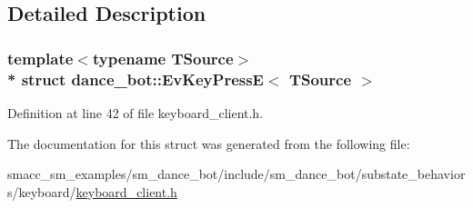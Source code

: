 \subsection{Detailed Description}
\subsubsection*{template$<$typename T\+Source$>$\\*
struct dance\+\_\+bot\+::\+Ev\+Key\+Press\+E$<$ T\+Source $>$}



Definition at line 42 of file keyboard\+\_\+client.\+h.



The documentation for this struct was generated from the following file\+:\begin{DoxyCompactItemize}
\item 
smacc\+\_\+sm\+\_\+examples/sm\+\_\+dance\+\_\+bot/include/sm\+\_\+dance\+\_\+bot/substate\+\_\+behaviors/keyboard/\hyperlink{keyboard__client_8h}{keyboard\+\_\+client.\+h}\end{DoxyCompactItemize}
